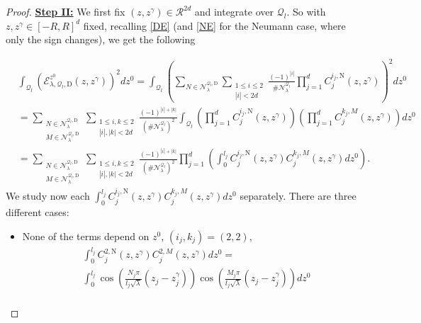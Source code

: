 \documentclass{amsart}
\theoremstyle{definition}
\theoremstyle{remark}
\renewcommand\leq\leqslant
\numberwithin{equation}{section}
\theoremstyle{definition}
\theoremstyle{remark}
\begin{document}
\begin{proof}
\textbf{	\underline{Step II:}}	We first fix $(z,z^\gamma)\in\mathcal{R}^{2d}$ and integrate over $\mathcal{Q}_l$. So with $z,z^\gamma\in [-R,R]^d$ fixed, recalling \eqref{DE} (and \eqref{NE} for the Neumann case, where only the sign changes), we get the following
	
	\begin{equation}
		\begin{aligned}
			&\int_{\mathcal{Q}_l}\left(\mathcal{E}_{\lambda,\mathcal{Q}_l,\mathrm{D}}^{z^0}(z,z^\gamma)\right)^2dz^0=\int_{\mathcal{Q}_l}\left(\sum_{N\in\mathcal{N}_\lambda^{\mathcal{Q}_l,\mathrm{D}}}\sum_{\substack{1\leq i\leq 2\\|i|<2d}}\frac{(-1)^{|i|}}{\#\mathcal{N}_\lambda^{\mathcal{Q}_l}}\prod_{j=1}^dC_j^{i_j,\mathrm{N}}(z,z^\gamma)\right)^2dz^0\\
			&=\sum_{\substack{N\in\mathcal{N}_\lambda^{\mathcal{Q}_l,\mathrm{D}}\\M\in\mathcal{N}_\lambda^{\mathcal{Q}_l,\mathrm{D}}}}\sum_{\substack{1\leq i,k\leq 2\\|i|,|k|<2d}}\frac{(-1)^{|i|+|k|}}{\left(\#\mathcal{N}_\lambda^{\mathcal{Q}_l}\right)^2} \int_{\mathcal{Q}_l}\left(\prod_{j=1}^dC_j^{i_j,\mathrm{N}}(z,z^\gamma)\right)\left(\prod_{j=1}^dC_j^{k_j,M}(z,z^\gamma)\right)dz^0\\
			&=\sum_{\substack{N\in\mathcal{N}_\lambda^{\mathcal{Q}_l,\mathrm{D}}\\M\in\mathcal{N}_\lambda^{\mathcal{Q}_l,\mathrm{D}}}}\sum_{\substack{1\leq i,k\leq 2\\|i|,|k|<2d}} \frac{(-1)^{|i|+|k|}}{\left(\#\mathcal{N}_\lambda^{\mathcal{Q}_l}\right)^2}\prod_{j=1}^d\left(\int_{0}^{l_j}C_j^{i_j,\mathrm{N}}(z,z^\gamma)C_j^{k_j,M}(z,z^\gamma)dz^0\right).
		\end{aligned}
	\end{equation}We study now each $\int_{0}^{l_j}C_j^{i_j,\mathrm{N}}(z,z^\gamma)C_j^{k_j,M}(z,z^\gamma)dz^0$ separately. There are three different cases:
	\begin{itemize}
		\item None of the terms depend on $z^0$, $(i_j,k_j)=(2,2)$, \begin{equation}
			\begin{aligned}
				&\int_{0}^{l_j}C_j^{2,\mathrm{N}}(z,z^\gamma)C_j^{2,M}(z,z^\gamma)dz^0=	\\&\int_{0}^{l_j}\cos\left(\frac{N_j\pi}{l_j\sqrt{\lambda}}(z_j-z^\gamma_j)\right)\cos\left(\frac{M_j\pi}{l_j\sqrt{\lambda}}(z_j-z^\gamma_j)\right)dz^0\\

\end{aligned}
\end{equation}
\end{itemize}
\end{proof}
\end{document}
